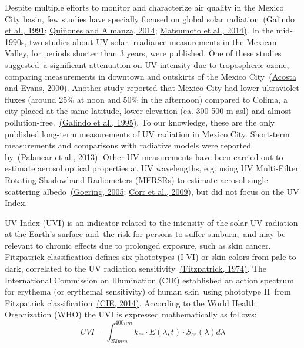 \documentclass[10pt]{article}
\begin{document}
Despite multiple efforts to monitor and characterize air quality in the
Mexico City basin, few studies have specially focused on global solar
radiation~\hyperref[csl:15]{(Galindo et al., 1991}; \hyperref[csl:16]{Qui{\~{n}}ones and Almanza, 2014}; \hyperref[csl:17]{Matsumoto et al., 2014)}. In the mid-1990s, two studies about UV
solar irradiance measurements in the Mexican Valley, for periods shorter
than 3 years, were published. One of these studies suggested~a
significant attenuation on UV intensity due to tropospheric ozone,
comparing measurements in downtown and outskirts of the Mexico
City~\hyperref[csl:18]{(Acosta and Evans, 2000)}. Another study reported that Mexico City had
lower ultraviolet fluxes (around 25\% at noon and 50\% in the afternoon)
compared to Colima, a city placed at the same latitude, lower elevation
(ca. 300-500 m asl) and almost pollution-free.~\hyperref[csl:19]{(Galindo et al., 1995)}. To
our knowledge, these are the only published long-term measurements of UV
radiation in Mexico City. Short-term measurements and comparisons with
radiative models were reported by~\hyperref[csl:13]{(Palancar et al., 2013)}. Other UV
measurements have been carried out to estimate aerosol optical
properties at UV wavelengths, e.g. using UV Multi-Filter Rotating
Shadowband Radiometers (MFRSRs) to estimate aerosol single scattering
albedo~\hyperref[csl:20]{(Goering, 2005}; \hyperref[csl:21]{Corr et al., 2009)}, but did not focus on the UV Index. ~

UV Index (UVI) is an indicator related to the intensity of the solar UV
radiation at the Earth's surface and~the risk for persons to suffer
sunburn,~and may be relevant to chronic effects due to prolonged
exposure, such as skin cancer. Fitzpatrick classification defines six
phototypes (I-VI) or skin colors from pale to dark, correlated to the UV
radiation sensitivity~\hyperref[csl:22]{(Fitzpatrick, 1974)}. The International Commission
on Illumination (CIE) established an action spectrum for erythema (or
erythemal sensitivity) of human skin~using phototype II~from Fitzpatrick
classification~\hyperref[csl:23]{(CIE, 2014)}. According to the World Health
Organization (WHO) the UVI is expressed mathematically as
follows:\[UVI=\int_{250nm}^{400nm}k_{er}\cdot E(\lambda,t)\cdot S_{er}\left(\lambda\right)d\lambda\]
\end{document}
